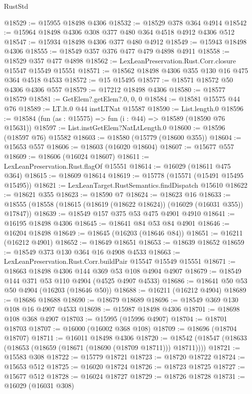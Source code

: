 \begin{lexlean}{RustStd}
\begin{coremodule}
{\begin{coremodule}
{{{{{{{{{{{{{{{{{{{{{{{{{{{{{{{{{{{{{{{{{{{{{{{{{{{{{{{{{{{{@18529 := @15955 @18498 @4306
@18532 := @18529 @378 @364 @4914
@18542 := @15964 @18498 @4306 @308 @377 @480 @364 @4518 @4912 @4306 @512
@18547 := @15934 @18498 @4306 @377 @480 @4912
@18549 := @15943 @18498 @4306
@18555 := @18549 @357 @376 @477 @479 @4898 @4911
@18558 := @18529 @357 @477 @4898
@18562 := LexLeanPreservation.Rust.Corr.closure @15547 @15549 @15551
@18571 := @18562 @18498 @4306 @355 @130 @16 @475 @364 @4518 @4533
@18572 := @15 @15495
@18577 := @18571 @18572 @50 @4306 @4306 @557
@18579 := @17212 @18498 @4306
@18580 := @18577 @18579
@18581 := GetElem?.getElem?.{0, 0, 0}
@18584 := @18581 @15575 @44 @76
@18589 := LT.lt.{0} @44 instLTNat @15587
@18590 := List.length.{0}
@18596 := @18584 (fun (as : @15575) => fun (i : @44) => @18589 (@18590 @76 @15631))
@18597 := List.instGetElem?NatLtLength.{0}
@18600 := @18596 (@18597 @76) @15582
@18603 := @18580 (@15779 (@18600 @355))
@18604 := @15653 @557
@18606 := @18603 (@16020 @18604)
@18607 := @15677 @557
@18609 := @18606 (@16024 @18607)
@18611 := LexLeanPreservation.Rust.flagOf @15551
@18614 := @16029 (@18611 @475 @364)
@18615 := @18609 @18614
@18619 := @15778 (@15571 (@15491 @15495 @15495))
@18621 := LexLeanTarget.RustSemantics.findDispatch @15610
@18622 := @18621 @355
@18623 := @18590 @7
@18624 := @18623 @16
@18633 := @18555 (@18558 (@18615 (@18619 (@18622 @18624)) (@16029 (@16031 @355)) @17847))
@18639 := @18549 @157 @375 @53 @475 @4901 @4910
@18641 := @16195 @18498 @4306
@18645 := @18641 @84 @53 @84 @4901
@18646 := @16204 @18498
@18649 := @18645 (@16203 (@18646 @84))
@18651 := @16211 (@16212 @4901)
@18652 := @18649 @18651
@18653 := @18639 @18652
@18659 := @18549 @373 @130 @364 @16 @4908 @4533
@18663 := LexLeanPreservation.Rust.Corr.buildPair @15547 @15549 @15551
@18671 := @18663 @18498 @4306 @144 @369 @53 @108 @4904 @4907
@18679 := @18549 @144 @371 @53 @110 @4904 (@4525 @4907 @4533)
@18686 := @18641 @50 @53 @50 @4904 (@16203 (@18646 @50))
@18688 := @16211 (@16212 @4904)
@18689 := @18686 @18688
@18690 := @18679 @18689
@18696 := @18549 @369 @130 @108 @16 @4907 @4533
@18698 := @15987 @18498 @4306
@18701 := @18698 @108 @368 @4907
@18703 := @15995 (@15996 @4907)
@18704 := @18701 @18703
@18707 := @16000 (@16002 @368 @108)
@18709 := @18696 (@18704 @18707)
@18711 := @16011 @18498 @4306
@18720 := @18542 (@18547 (@18633 (@18653 (@18659 (@18671 (@18690 (@18709 @18711))) @18711))))
@18721 := @15583 @308
@18722 := @15779 @18721
@18723 := @18720 @18722
@18724 := @15653 @512
@18725 := @16020 @18724
@18726 := @18723 @18725
@18727 := @15677 @512
@18728 := @16024 @18727
@18729 := @18726 @18728
@18731 := @16029 (@16031 @308)
}}}}}}}}}}}}}}}}}}}}}}}}}}}}}}}}}}}}}}}}}}}}}}}}}}}}}}}}}}}}
\end{coremodule}}
\end{coremodule}
\end{lexlean}

